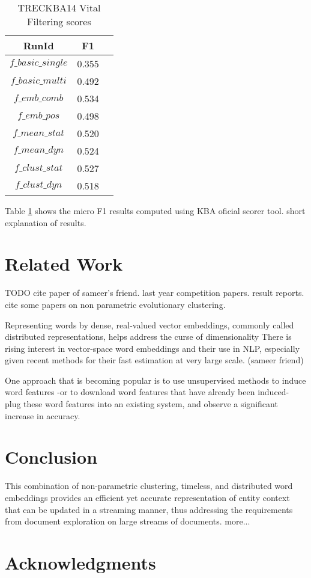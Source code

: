 \documentclass{article}
\begin{document}
\begin{table}[H]
\center
\begin{tabular}{|c|c|c|} \hline
\textbf{RunId} & \textbf{F1} \\ \hline\hline
$f\_basic\_single$ & 0.355 \\ \hline
$f\_basic\_multi$ & 0.492 \\ \hline
$f\_emb\_comb$ & 0.534 \\ \hline
$f\_emb\_pos$ & 0.498 \\ \hline
$f\_mean\_stat$ & 0.520 \\ \hline
$f\_mean\_dyn$ & 0.524 \\ \hline
$f\_clust\_stat$ & 0.527 \\ \hline
$f\_clust\_dyn$ & 0.518 \\ \hline
\end{tabular}
\caption{TRECKBA14 Vital Filtering scores}
\label{f1}
\end{table}

Table \ref{f1} shows the micro F1 results computed using KBA oficial scorer tool.
short explanation of results.

\section{Related Work}
\label{related}

TODO 
cite paper of sameer's friend.
last year competition papers. result reports.
cite some papers on non parametric evolutionary clustering.

Representing words by dense, real-valued vector embeddings, commonly called distributed representations, helps address the curse of dimensionality
There is rising interest in vector-space word embeddings and their use in NLP, especially given recent methods for their fast estimation at very large scale. (sameer friend)

One approach that is becoming popular is to use unsupervised methods to induce word features -or to download word features that have already been induced- plug these word features into an existing system, and observe a significant increase in accuracy.

\section{Conclusion}
\label{conclusion}

This combination of non-parametric clustering, timeless, and distributed word embeddings provides an efficient yet accurate representation of entity context that can be updated in a streaming manner, thus addressing the requirements from document exploration on large streams of documents.
more...

\section*{Acknowledgments} 
 


\end{document}
